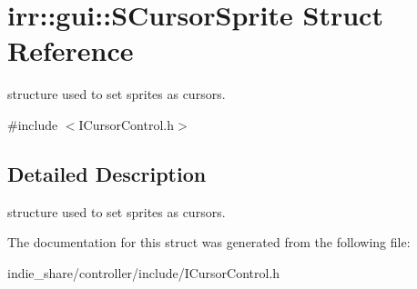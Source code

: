 \hypertarget{structirr_1_1gui_1_1SCursorSprite}{}\section{irr\+:\+:gui\+:\+:S\+Cursor\+Sprite Struct Reference}
\label{structirr_1_1gui_1_1SCursorSprite}


structure used to set sprites as cursors.  




{\ttfamily \#include $<$I\+Cursor\+Control.\+h$>$}



\subsection{Detailed Description}
structure used to set sprites as cursors. 

The documentation for this struct was generated from the following file\+:\begin{DoxyCompactItemize}
\item 
indie\+\_\+share/controller/include/I\+Cursor\+Control.\+h\end{DoxyCompactItemize}
